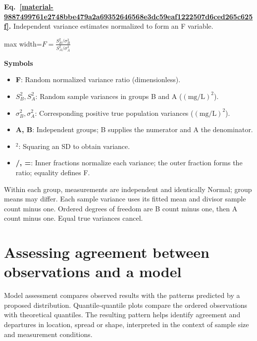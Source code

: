 \documentclass[11pt,a4paper]{article}
\begin{document}
\par\medskip
\begin{samepage}
\label{material-9887499761e2748bbe479a2a69352646568e3dc59eaf1222507d6ced265c625f}
\noindent\textbf{Eq.~\ref*{material-9887499761e2748bbe479a2a69352646568e3dc59eaf1222507d6ced265c625f}.} Independent variance estimates normalized to form an F variable.\par\nopagebreak
\begin{center}\begin{adjustbox}{max width=\linewidth}$\displaystyle F=\frac{S_B^2/\sigma_B^2}{S_A^2/\sigma_A^2}$\end{adjustbox}\end{center}

\par\noindent\textbf{Symbols}

\begin{itemize}\setlength{\itemsep}{1pt}\setlength{\parsep}{0pt}
\item \textbf{F}: Random normalized variance ratio (dimensionless).
\item \textbf{\(S_B^2, S_A^2\)}: Random sample variances in groups B and A (\(\mathrm{(mg/L)^2}\)).
\item \textbf{\(σ_B^2, σ_A^2\)}: Corresponding positive true population variances (\(\mathrm{(mg/L)^2}\)).
\item \textbf{A, B}: Independent groups; B supplies the numerator and A the denominator.
\item \textbf{\ensuremath{{}^2}}: Squaring an SD to obtain variance.
\item \textbf{/, =}: Inner fractions normalize each variance; the outer fraction forms the ratio; equality defines F.
\end{itemize}

Within each group, measurements are independent and identically Normal; group means may differ. Each sample variance uses its fitted mean and divisor sample count minus one. Ordered degrees of freedom are B count minus one, then A count minus one. Equal true variances cancel.

\end{samepage}
\medskip

\clearpage
\section{Assessing agreement between observations and a model}
Model assessment compares observed results with the patterns predicted by a proposed distribution. Quantile-quantile plots compare the ordered observations with theoretical quantiles. The resulting pattern helps identify agreement and departures in location, spread or shape, interpreted in the context of sample size and measurement conditions.
\end{document}

